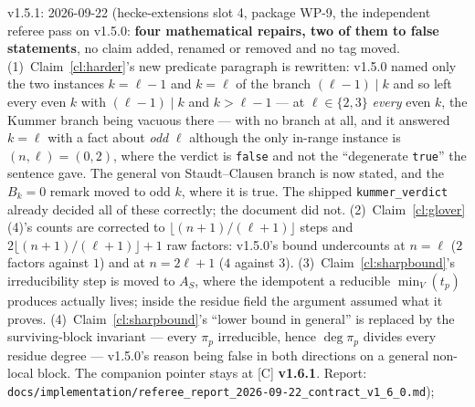 \documentclass[11pt]{article}
\theoremstyle{remark}
\begin{document}
v1.5.1: 2026-09-22 (hecke-extensions slot 4, package WP-9, the independent
referee pass on v1.5.0: \textbf{four mathematical repairs, two of them to false statements},
no claim added, renamed or removed and no tag moved.
(1)~Claim~\ref{cl:harder}'s new predicate paragraph is rewritten: v1.5.0 named only the two
instances $k=\ell-1$ and $k=\ell$ of the branch $(\ell-1)\mid k$ and so left every even $k$
with $(\ell-1)\mid k$ and $k>\ell-1$ --- at $\ell\in\{2,3\}$ \emph{every} even $k$, the
Kummer branch being vacuous there --- with no branch at all, and it answered $k=\ell$ with a
fact about \emph{odd} $\ell$ although the only in-range instance is $(n,\ell)=(0,2)$, where
the verdict is \texttt{false} and not the ``degenerate \texttt{true}'' the sentence gave.
The general von Staudt--Clausen branch is now stated, and the $B_k=0$ remark moved to odd
$k$, where it is true. The shipped \texttt{kummer\_verdict} already decided all of these
correctly; the document did not.
(2)~Claim~\ref{cl:glover}(4)'s counts are corrected to $\lfloor(n+1)/(\ell+1)\rfloor$ steps
and $2\lfloor(n+1)/(\ell+1)\rfloor+1$ raw factors: v1.5.0's bound undercounts at $n=\ell$
($2$ factors against $1$) and at $n=2\ell+1$ ($4$ against $3$).
(3)~Claim~\ref{cl:sharpbound}'s irreducibility step is moved to $A_S$, where the idempotent
a reducible $\min_V(t_p)$ produces actually lives; inside the residue field the argument
assumed what it proves.
(4)~Claim~\ref{cl:sharpbound}'s ``lower bound in general'' is replaced by the
surviving-block invariant --- every $\pi_p$ irreducible, hence $\deg\pi_p$ divides every
residue degree --- v1.5.0's reason being false in both directions on a general non-local
block. The companion pointer stays at [C] \textbf{v1.6.1}. Report:
\texttt{docs/implementation/referee\_report\_2026-09-22\_contract\_v1\_6\_0.md});
\end{document}
